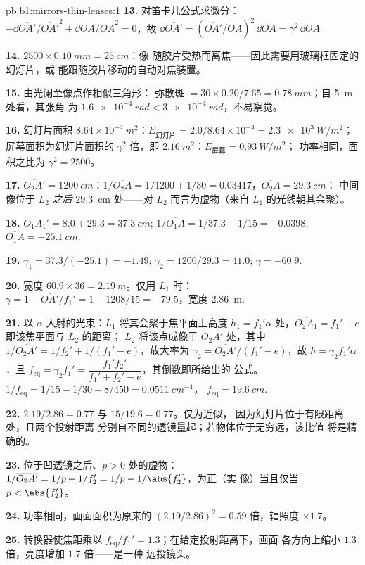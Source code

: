 \begin{solution}{pb:b1:mirrors-thin-lenses:1}
\textbf{13.} 对笛卡儿公式求微分：$-\dd\overline{OA'}/\overline{OA'}^2
+ \dd\overline{OA}/\overline{OA}^2 = 0$，故 $\dd\overline{OA'} =
(\overline{OA'}/\overline{OA})^2\,\dd\overline{OA} = \gamma^2\,\dd\overline{OA}$.

\textbf{14.} $2500 \times \qty{0.10}{mm} = \qty{25}{cm}$：像
随胶片受热而离焦——因此需要用玻璃框固定的幻灯片，或
能跟随胶片移动的自动对焦装置。

\textbf{15.} 由光阑至像点作相似三角形：
弥散斑 $= 30 \times 0.20/7.65 = \qty{0.78}{mm}$；自 \qty{5}{m} 处看，其张角
为 $\qty{1.6e-4}{rad} < \qty{3e-4}{rad}$，不易察觉。

\textbf{16.} 幻灯片面积 $8.64\times10^{-4}\ \unit{m^2}$：$E_{\text{幻灯片}}
= 2.0/8.64\times10^{-4} = \qty{2.3e3}{W/m^2}$；屏幕面积为幻灯片面积的 $\gamma^2$
倍，即 $\qty{2.16}{m^2}$：$E_{\text{屏幕}} = \qty{0.93}{W/m^2}$；
功率相同，面积之比为 $\gamma^2 = 2500$。

\textbf{17.} $\overline{O_2A'} = \qty{1200}{cm}$：$1/\overline{O_2A} =
1/1200 + 1/30 = 0.03417$，$\overline{O_2A} = \qty{+29.3}{cm}$：
中间像位于 $L_2$ \emph{之后} \qty{29.3}{cm} 处——对
$L_2$ 而言为虚物（来自 $L_1$ 的光线朝其会聚）。

\textbf{18.} $\overline{O_1A_1'} = 8.0 + 29.3 = \qty{37.3}{cm}$;
$1/\overline{O_1A} = 1/37.3 - 1/15 = -0.0398$, $\overline{O_1A} =
\qty{-25.1}{cm}$.

\textbf{19.} $\gamma_1 = 37.3/(-25.1) = -1.49$; $\gamma_2 = 1200/29.3 =
41.0$; $\gamma = -60.9$.

\textbf{20.} 宽度 $60.9 \times 36 = \qty{2.19}{m}$。仅用 $L_1$ 时：
$\gamma = 1 - \overline{OA'}/f_1' = 1 - 1208/15 = -79.5$，宽度
\qty{2.86}{m}.

\textbf{21.} 以 $\alpha$ 入射的光束：$L_1$ 将其会聚于焦平面上高度 $h_1 = f_1'\alpha$
处，$\overline{O_2A_1} = f_1' - e$ 即该焦平面与 $L_2$ 的距离；
$L_2$ 将该点成像于 $\overline{O_2A'}$ 处，其中 $1/\overline{O_2A'}
= 1/f_2' + 1/(f_1' - e)$，放大率为 $\gamma_2 = \overline{O_2A'}/(f_1'
- e)$，故 $h = \gamma_2 f_1'\alpha$，且 $f_{\mathrm{eq}} = \gamma_2 f_1'
= \dfrac{f_1' f_2'}{f_1' + f_2' - e}$，其倒数即所给出的
公式。$1/f_{\mathrm{eq}} = 1/15 - 1/30 + 8/450 = \qty{0.0511}{cm^{-1}}$，
$f_{\mathrm{eq}} = \qty{19.6}{cm}$.

\textbf{22.} $2.19/2.86 = 0.77$ 与 $15/19.6 = 0.77$。仅为近似，
因为幻灯片位于有限距离处，且两个投射距离
分别自不同的透镜量起；若物体位于无穷远，该比值
将是精确的。

\textbf{23.} 位于凹透镜之后、$p > 0$ 处的虚物：
$1/\overline{O_2A'} = 1/p + 1/f_2' = 1/p - 1/\abs{f_2'}$，为正（实
像）当且仅当 $p < \abs{f_2'}$。

\textbf{24.} 功率相同，画面面积为原来的 $(2.19/2.86)^2 = 0.59$
倍，辐照度 $\times 1.7$。

\textbf{25.} 转换器使焦距乘以
$f_{\mathrm{eq}}/f_1' = 1.3$；在给定投射距离下，画面
各方向上缩小 $1.3$ 倍，亮度增加 $1.7$ 倍——是一种
远投镜头。
\end{solution}
